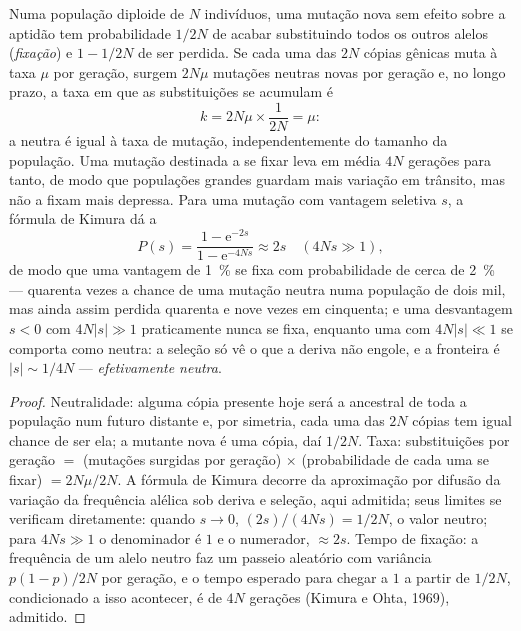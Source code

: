 \begin{theorem}\label{thm:b3:molecular-evolution:neutral}
Numa população diploide de $N$ indivíduos, uma mutação nova sem efeito
sobre a aptidão tem probabilidade $1/2N$ de acabar substituindo todos os
outros alelos (\emph{fixação}) e $1 - 1/2N$ de ser perdida. Se cada uma
das $2N$ cópias gênicas muta à taxa $\mu$ por geração, surgem $2N\mu$
mutações neutras novas por geração e, no longo prazo, a taxa em que as
substituições se acumulam é
\[
k = 2N\mu\times\frac{1}{2N} = \mu :
\]
a \emph{} neutra é igual à taxa de mutação,
independentemente do tamanho da população. Uma mutação destinada a se
fixar leva em média $4N$ gerações para tanto, de modo que populações
grandes guardam mais variação em trânsito, mas não a fixam mais depressa.
Para uma mutação com vantagem seletiva $s$, a fórmula de Kimura dá a
\[
P(s) = \frac{1 - \mathrm{e}^{-2s}}{1 - \mathrm{e}^{-4Ns}} \approx 2s
\quad (4Ns \gg 1),
\]
de modo que uma vantagem de \qty{1}{\%} se fixa com probabilidade de
cerca de \qty{2}{\%} --- quarenta vezes a chance de uma mutação neutra
numa população de dois mil, mas ainda assim perdida quarenta e nove vezes
em cinquenta; e uma desvantagem $s < 0$ com $4N|s| \gg 1$ praticamente
nunca se fixa, enquanto uma com $4N|s| \ll 1$ se comporta como neutra: a
seleção só vê o que a deriva não engole, e a fronteira é $|s| \sim
1/4N$
--- \emph{efetivamente neutra}.
\end{theorem}
\begin{proof}
Neutralidade: alguma cópia presente hoje será a ancestral de toda a
população num futuro distante e, por simetria, cada uma das $2N$ cópias
tem igual chance de ser ela; a mutante nova é uma cópia, daí $1/2N$.
Taxa: substituições por geração $=$ (mutações surgidas por geração)
$\times$ (probabilidade de cada uma se fixar) $= 2N\mu/2N$. A fórmula de
Kimura decorre da aproximação por difusão da variação da frequência
alélica sob deriva e seleção, aqui admitida; seus limites se verificam
diretamente: quando $s \to 0$, $(2s)/(4Ns) = 1/2N$, o valor neutro; para
$4Ns \gg 1$ o denominador é $1$ e o numerador, $\approx 2s$. Tempo de
fixação: a frequência de um alelo neutro faz um passeio aleatório com
variância $p(1-p)/2N$ por geração, e o tempo esperado para chegar a $1$
a partir de $1/2N$, condicionado a isso acontecer, é de $4N$ gerações
(Kimura e Ohta, 1969), admitido.
\end{proof}

